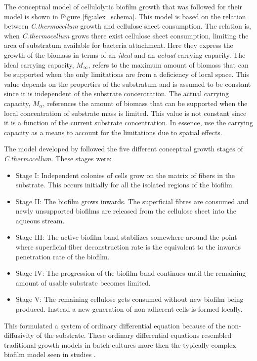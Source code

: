The conceptual model of cellulolytic biofilm growth that was followed for their model is shown in Figure \ref{fig:alex_schema}.
This model is based on the relation between \textit{C.thermocellum} growth and cellulose sheet consumption.
The relation is, when \textit{C.thermocellum} grows there exist cellulose sheet consumption, limiting the area of substratum available for bacteria attachment.
Here they express the growth of the biomass in terms of an \textit{ideal} and an \textit{actual} carrying capacity.
The ideal carrying capacity, $M_{\infty}$, refers to the maximum amount of biomass that can be supported when the only limitations are from a deficiency of local space.
This value depends on the properties of the substratum and is assumed to be constant since it is independent of the substrate concentration.
The actual carrying capacity, $M_{\alpha}$, references the amount of biomass that can be supported when the local concentration of substrate mass is limited.
This value is not constant since it is a function of the current substrate concentration.
In essence, \cite{dumitrache2015mathematicalModeling} use the carrying capacity as a means to account for the limitations due to spatial effects.

The model developed by \cite{dumitrache2015mathematicalModeling} followed the five different conceptual growth stages of \textit{C.thermocellum}.
These stages were:
\begin{itemize}
  \item Stage I: Independent colonies of cells grow on the matrix of fibers in the substrate. This occurs initially for all the isolated regions of the biofilm.
  \item Stage II: The biofilm grows inwards. The superficial fibres are consumed and newly unsupported biofilms are released from the cellulose sheet into the aqueous stream.
  \item Stage III: The active biofilm band stabilizes somewhere around the point where superficial fiber deconstruction rate is the equivalent to the inwards penetration rate of the biofilm.
  \item Stage IV: The progression of the biofilm band continues until the remaining amount of usable substrate becomes limited.
  \item Stage V: The remaining cellulose gets consumed without new biofilm being produced. Instead a new generation of non-adherent cells is formed locally.
\end{itemize}
This formulated a system of ordinary differential equation because of the non-diffusivity of the substrate.
These ordinary differential equations resembled traditional growth models in batch cultures more then the typically complex biofilm model seen in studies \citep{wanner2005mathematical}. 

